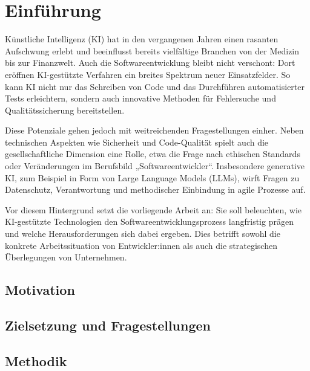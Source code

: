 \chapter{Einführung}
Künstliche Intelligenz (KI) hat in den vergangenen Jahren einen rasanten
Aufschwung erlebt und beeinflusst bereits vielfältige Branchen von der Medizin
bis zur Finanzwelt. Auch die Softwareentwicklung bleibt nicht verschont: Dort
eröffnen KI-gestützte Verfahren ein breites Spektrum neuer Einsatzfelder. So
kann KI nicht nur das Schreiben von Code und das Durchführen automatisierter
Tests erleichtern, sondern auch innovative Methoden für Fehlersuche und
Qualitätssicherung bereitstellen.

Diese Potenziale gehen jedoch mit weitreichenden Fragestellungen einher. Neben
technischen Aspekten wie Sicherheit und Code-Qualität spielt auch die
gesellschaftliche Dimension eine Rolle, etwa die Frage nach ethischen Standards
oder Veränderungen im Berufsbild „Softwareentwickler“. Insbesondere generative
KI, zum Beispiel in Form von Large Language Models (LLMs), wirft Fragen zu
Datenschutz, Verantwortung und methodischer Einbindung in agile Prozesse auf.

Vor diesem Hintergrund setzt die vorliegende Arbeit an: Sie soll beleuchten,
wie KI-gestützte Technologien den Softwareentwicklungsprozess langfristig
prägen und welche Herausforderungen sich dabei ergeben. Dies betrifft sowohl
die konkrete Arbeitssituation von Entwickler:innen als auch die strategischen
Überlegungen von Unternehmen.

\section{Motivation}


\section{Zielsetzung und Fragestellungen}


\section{Methodik}


% 

